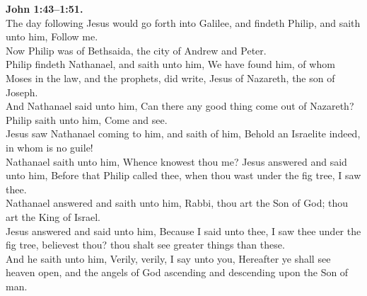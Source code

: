 \documentclass[10pt]{article} %
\begin{document}
{\begin{minipage}[t]{0.45\textwidth}
\textbf{John 1:43--1:51.}\\
The day following Jesus would go forth into Galilee, and findeth Philip, and saith unto him, Follow me.\\
Now Philip was of Bethsaida, the city of Andrew and Peter.\\
Philip findeth Nathanael, and saith unto him, We have found him, of whom Moses in the law, and the prophets, did write, Jesus of Nazareth, the son of Joseph.\\
And Nathanael said unto him, Can there any good thing come out of Nazareth? Philip saith unto him, Come and see.\\
Jesus saw Nathanael coming to him, and saith of him, Behold an Israelite indeed, in whom is no guile!\\
Nathanael saith unto him, Whence knowest thou me? Jesus answered and said unto him, Before that Philip called thee, when thou wast under the fig tree, I saw thee.\\
Nathanael answered and saith unto him, Rabbi, thou art the Son of God; thou art the King of Israel.\\
Jesus answered and said unto him, Because I said unto thee, I saw thee under the fig tree, believest thou? thou shalt see greater things than these.\\
And he saith unto him, Verily, verily, I say unto you, Hereafter ye shall see heaven open, and the angels of God ascending and descending upon the Son of man.\\

\end{minipage}}
\vspace*{\fill}
\newpage
\Huge%
\vspace*{\fill}
\begin{spacing}{1.0}
\end{spacing}
\vspace*{\fill}
\end{document}

